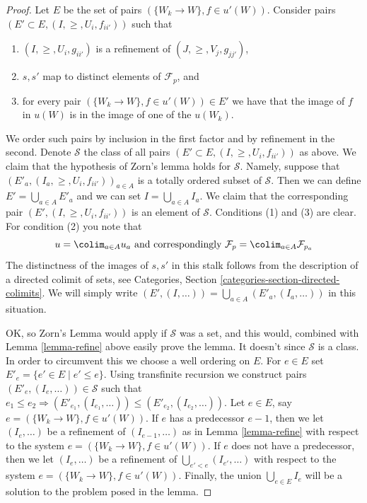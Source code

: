 \begin{proof}
Let $E$ be the set of pairs $(\{W_k \to W\}, f\in u'(W))$.
Consider pairs $(E' \subset E, (I, \geq, U_i, f_{ii'}))$
such that
\begin{enumerate}
\item $(I, \geq, U_i, g_{ii'})$ is a refinement of $(J, \geq, V_j, g_{jj'})$,
\item $s, s'$ map to distinct elements of $\mathcal{F}_p$, and
\item for every pair $(\{W_k \to W\}, f\in u'(W)) \in E'$ we have that
the image of $f$ in $u(W)$ is in the image of one of the $u(W_k)$.
\end{enumerate}
We order such pairs by inclusion in the first factor and
by refinement in the second. Denote $\mathcal{S}$ the class
of all pairs $(E' \subset E, (I, \geq, U_i, f_{ii'}))$ as above.
We claim that the hypothesis of Zorn's lemma holds for $\mathcal{S}$. Namely,
suppose that $(E'_a, (I_a, \geq, U_i, f_{ii'}))_{a \in A}$
is a totally ordered subset of $\mathcal{S}$. Then we can define
$E' = \bigcup_{a \in A} E'_a$ and we can set $I = \bigcup_{a \in A} I_a$.
We claim that the corresponding pair
$(E' , (I, \geq, U_i, f_{ii'}))$ is an element of $\mathcal{S}$.
Conditions (1) and (3) are clear. For condition (2) you note
that
$$
u = \colim_{a \in A} u_a
\text{ and correspondingly }
\mathcal{F}_p = \colim_{a \in A} \mathcal{F}_{p_a}
$$
The distinctness of the images of $s, s'$ in this stalk follows
from the description of a directed colimit of sets, see
Categories, Section \ref{categories-section-directed-colimits}.
We will simply write
$(E', (I, \ldots)) = \bigcup_{a \in A}(E'_a, (I_a, \ldots))$
in this situation.

\medskip\noindent
OK, so Zorn's Lemma would apply if $\mathcal{S}$ was a set,
and this would, combined with Lemma \ref{lemma-refine} above easily prove
the lemma. It doesn't since $\mathcal{S}$ is a class. In order
to circumvent this we choose a well ordering on $E$.
For $e \in E$ set $E'_e = \{e' \in E \mid e' \leq e\}$.
Using transfinite recursion we construct pairs
$(E'_e, (I_e, \ldots)) \in \mathcal{S}$ such that
$e_1 \leq e_2 \Rightarrow (E'_{e_1}, (I_{e_1}, \ldots))
\leq (E'_{e_2}, (I_{e_2}, \ldots))$.
Let $e \in E$, say $e = (\{W_k \to W\}, f\in u'(W))$.
If $e$ has a predecessor $e - 1$, then we let
$(I_e, \ldots)$ be a refinement of $(I_{e - 1}, \ldots)$
as in Lemma \ref{lemma-refine} with respect to the system
$e = (\{W_k \to W\}, f\in u'(W))$.
If $e$ does not have a predecessor, then we let
$(I_e, \ldots)$ be a refinement of $\bigcup_{e' < e} (I_{e'}, \ldots)$
with respect to the system
$e = (\{W_k \to W\}, f\in u'(W))$.
Finally, the union $\bigcup_{e \in E} I_e$ will be a solution to
the problem posed in the lemma.
\end{proof}

